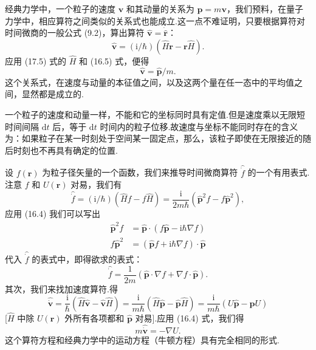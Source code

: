 经典力学中，一个粒子的速度 $\boldsymbol{v}$ 和其动量的关系为 $\boldsymbol{p}=m\boldsymbol{v}$，我们预料，在量子力学中，相应算符之间类似的关系式也能成立.这一点不难证明，只要根据算符对时间微商的一般公式 (9.2)，算出算符 $\hat{\boldsymbol{v}}=\dot{\hat{\boldsymbol{r}}}$：
\begin{equation*}
  \hat{\boldsymbol{v}}=(\mathrm{i}/\hbar)\left(\hat{H}\boldsymbol{r}-\boldsymbol{r}\hat{H}\right).
\end{equation*}
应用 (17.5) 式的 $\hat{H}$ 和 (16.5) 式，便得
\begin{equation}
  \hat{\boldsymbol{v}}=\hat{\boldsymbol{p}}/m.
\end{equation}
这个关系式，在速度与动量的本征值之间，以及这两个量在任一态中的平均值之间，显然都是成立的.

一个粒子的速度和动量一样，不能和它的坐标同时具有定值.但是速度乘以无限短时间间隔 $\mathrm{d}t$ 后，等于 $\mathrm{d}t$ 时间内的粒子位移.故速度与坐标不能同时存在的含义为：如果粒子在某一时刻处于空间某一固定点，那么，该粒子即使在无限接近的随后时刻也不再具有确定的位置.

设 $f(\boldsymbol{r})$ 为粒子径矢量的一个函数，我们来推导时间微商算符 $\hat{\dot{f}}$ 的一个有用表式.注意 $f$ 和 $U(\boldsymbol{r})$ 对易，我们有
\begin{equation*}
  \hat{\dot{f}}=(\mathrm{i}/\hbar)\left(\hat{H}f-f\hat{H}\right)
  =\frac{\mathrm{i}}{2m\hbar}\left(\hat{\boldsymbol{p}}^2 f-f\hat{\boldsymbol{p}}^2\right),
\end{equation*}
应用 (16.4) 我们可以写出
\begin{equation*}
\begin{aligned}
  \hat{\boldsymbol{p}}^2 f
  &=\hat{\boldsymbol{p}}\cdot\left(f\hat{\boldsymbol{p}}-\mathrm{i}\hbar\nabla f\right)\\
  f\hat{\boldsymbol{p}}^2
  &=\left(\hat{\boldsymbol{p}}f+\mathrm{i}\hbar\nabla f\right)\cdot\hat{\boldsymbol{p}}
\end{aligned}
\end{equation*}
代入 $\hat{\dot{f}}$ 的表式中，即得欲求的表式：
\begin{equation}
  \hat{\dot{f}}=\frac{1}{2m}\left(\hat{\boldsymbol{p}}\cdot\nabla f
  +\nabla f\cdot\hat{\boldsymbol{p}}\right).
\end{equation}
其次，我们来找加速度算符.得
\begin{equation*}
  \hat{\dot{\boldsymbol{v}}}
  =\frac{\mathrm{i}}{\hbar}\left(\hat{H}\hat{\boldsymbol{v}}-\hat{\boldsymbol{v}}\hat{H}\right)
  =\frac{\mathrm{i}}{m\hbar}\left(\hat{H}\hat{\boldsymbol{p}}-\hat{\boldsymbol{p}}\hat{H}\right)
  =\frac{\mathrm{i}}{m\hbar}\left(U\hat{\boldsymbol{p}}-\hat{\boldsymbol{p}}U\right)
\end{equation*}
[$\hat{H}$ 中除 $U(\boldsymbol{r})$ 外所有各项都和 $\hat{\boldsymbol{p}}$ 对易].应用 (16.4) 式，我们得
\begin{equation}
  m\hat{\dot{\boldsymbol{v}}}=-\nabla U.
\end{equation}
这个算符方程和经典力学中的运动方程（牛顿方程）具有完全相同的形式.


